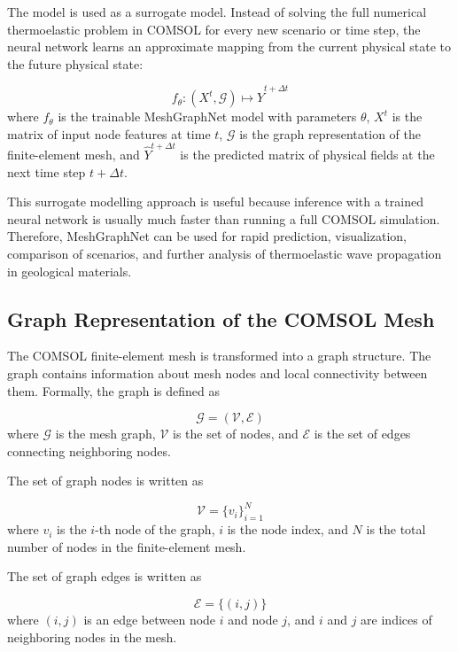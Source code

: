 The model is used as a surrogate model. Instead of solving the full numerical thermoelastic problem in COMSOL for every new scenario or time step, the neural network learns an approximate mapping from the current physical state to the future physical state:

\begin{equation}
f_{\theta}:
\left(
X^{t},
\mathcal{G}
\right)
\mapsto
\hat{Y}^{t+\Delta t}
\end{equation}
where \(f_{\theta}\) is the trainable MeshGraphNet model with parameters \(\theta\), \(X^{t}\) is the matrix of input node features at time \(t\), \(\mathcal{G}\) is the graph representation of the finite-element mesh, and \(\hat{Y}^{t+\Delta t}\) is the predicted matrix of physical fields at the next time step \(t+\Delta t\).

This surrogate modelling approach is useful because inference with a trained neural network is usually much faster than running a full COMSOL simulation. Therefore, MeshGraphNet can be used for rapid prediction, visualization, comparison of scenarios, and further analysis of thermoelastic wave propagation in geological materials.

\subsection{Graph Representation of the COMSOL Mesh}

The COMSOL finite-element mesh is transformed into a graph structure. The graph contains information about mesh nodes and local connectivity between them. Formally, the graph is defined as

\begin{equation}
\mathcal{G} = (\mathcal{V}, \mathcal{E})
\end{equation}
where \(\mathcal{G}\) is the mesh graph, \(\mathcal{V}\) is the set of nodes, and \(\mathcal{E}\) is the set of edges connecting neighboring nodes.

The set of graph nodes is written as

\begin{equation}
\mathcal{V} = \{v_i\}_{i=1}^{N}
\end{equation}
where \(v_i\) is the \(i\)-th node of the graph, \(i\) is the node index, and \(N\) is the total number of nodes in the finite-element mesh.

The set of graph edges is written as

\begin{equation}
\mathcal{E} = \{(i,j)\}
\end{equation}
where \((i,j)\) is an edge between node \(i\) and node \(j\), and \(i\) and \(j\) are indices of neighboring nodes in the mesh.

